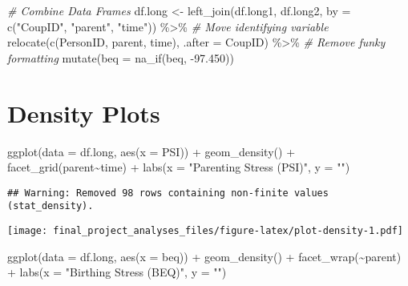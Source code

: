 \documentclass[
]{article}
\newenvironment{Shaded}{\begin{snugshade}}{\end{snugshade}}
\newcommand{\AttributeTok}[1]{\textcolor[rgb]{0.77,0.63,0.00}{#1}}
\newcommand{\CommentTok}[1]{\textcolor[rgb]{0.56,0.35,0.01}{\textit{#1}}}
\newcommand{\FloatTok}[1]{\textcolor[rgb]{0.00,0.00,0.81}{#1}}
\newcommand{\FunctionTok}[1]{\textcolor[rgb]{0.00,0.00,0.00}{#1}}
\newcommand{\NormalTok}[1]{#1}
\newcommand{\OtherTok}[1]{\textcolor[rgb]{0.56,0.35,0.01}{#1}}
\newcommand{\SpecialCharTok}[1]{\textcolor[rgb]{0.00,0.00,0.00}{#1}}
\newcommand{\StringTok}[1]{\textcolor[rgb]{0.31,0.60,0.02}{#1}}
\begin{document}
\begin{Shaded}
\begin{Highlighting}[]
\CommentTok{\# Combine Data Frames}
\NormalTok{df.long }\OtherTok{\textless{}{-}} \FunctionTok{left\_join}\NormalTok{(df.long1, df.long2, }\AttributeTok{by =} \FunctionTok{c}\NormalTok{(}\StringTok{"CoupID"}\NormalTok{, }\StringTok{"parent"}\NormalTok{, }\StringTok{"time"}\NormalTok{)) }\SpecialCharTok{\%\textgreater{}\%}
  \CommentTok{\# Move identifying variable}
  \FunctionTok{relocate}\NormalTok{(}\FunctionTok{c}\NormalTok{(PersonID, parent, time), }\AttributeTok{.after =}\NormalTok{ CoupID) }\SpecialCharTok{\%\textgreater{}\%}
  \CommentTok{\# Remove funky formatting}
  \FunctionTok{mutate}\NormalTok{(}\AttributeTok{beq =} \FunctionTok{na\_if}\NormalTok{(beq, }\SpecialCharTok{{-}}\FloatTok{97.450}\NormalTok{))}
\end{Highlighting}
\end{Shaded}

\hypertarget{density-plots}{%
\section{Density Plots}\label{density-plots}}

\begin{Shaded}
\begin{Highlighting}[]
\FunctionTok{ggplot}\NormalTok{(}\AttributeTok{data =}\NormalTok{ df.long, }\FunctionTok{aes}\NormalTok{(}\AttributeTok{x =}\NormalTok{ PSI)) }\SpecialCharTok{+}
  \FunctionTok{geom\_density}\NormalTok{() }\SpecialCharTok{+}
  \FunctionTok{facet\_grid}\NormalTok{(parent}\SpecialCharTok{\textasciitilde{}}\NormalTok{time) }\SpecialCharTok{+}
  \FunctionTok{labs}\NormalTok{(}\AttributeTok{x =} \StringTok{"Parenting Stress (PSI)"}\NormalTok{, }\AttributeTok{y =} \StringTok{""}\NormalTok{)}
\end{Highlighting}
\end{Shaded}

\begin{verbatim}
## Warning: Removed 98 rows containing non-finite values (stat_density).
\end{verbatim}

\texttt{[image: final\_project\_analyses\_files/figure-latex/plot-density-1.pdf]}

\begin{Shaded}
\begin{Highlighting}[]
\FunctionTok{ggplot}\NormalTok{(}\AttributeTok{data =}\NormalTok{ df.long, }\FunctionTok{aes}\NormalTok{(}\AttributeTok{x =}\NormalTok{ beq)) }\SpecialCharTok{+} 
  \FunctionTok{geom\_density}\NormalTok{() }\SpecialCharTok{+} 
  \FunctionTok{facet\_wrap}\NormalTok{(}\SpecialCharTok{\textasciitilde{}}\NormalTok{parent) }\SpecialCharTok{+}
  \FunctionTok{labs}\NormalTok{(}\AttributeTok{x =} \StringTok{"Birthing Stress (BEQ)"}\NormalTok{, }\AttributeTok{y =} \StringTok{""}\NormalTok{)}
\end{Highlighting}
\end{Shaded}
\end{document}
